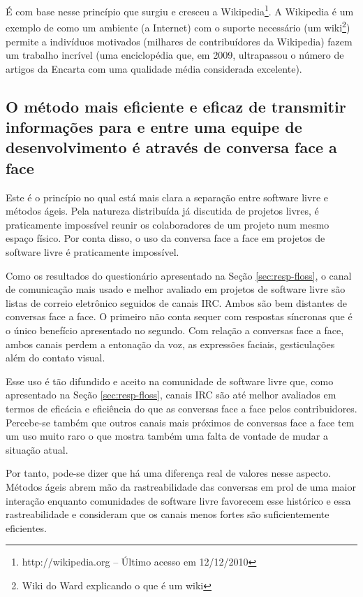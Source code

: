 É com base nesse princípio que surgiu e cresceu a
Wikipedia\footnote{http://wikipedia.org -- Último acesso em
  12/12/2010}. A Wikipedia é um exemplo de como um ambiente (a
Internet) com o suporte necessário (um wiki\footnote{Wiki do Ward
  explicando o que é um wiki}) permite a indivíduos motivados
(milhares de contribuídores da Wikipedia) fazem um trabalho incrível
(uma enciclopédia que, em 2009, ultrapassou o número de artigos da
Encarta com uma qualidade média considerada excelente).

\subsection[Conversa face a face]{O método mais eficiente e eficaz de
  transmitir informações para e entre uma equipe de desenvolvimento é
  através de conversa face a face}

Este é o princípio no qual está mais clara a separação entre software
livre e métodos ágeis. Pela natureza distribuída já discutida de
projetos livres, é praticamente impossível reunir os colaboradores de
um projeto num mesmo espaço físico. Por conta disso, o uso da conversa
face a face em projetos de software livre é praticamente impossível.

Como os resultados do questionário apresentado na Seção
\ref{sec:resp-floss}, o canal de comunicação mais usado e melhor
avaliado em projetos de software livre são listas de correio
eletrônico seguidos de canais IRC. Ambos são bem distantes de
conversas face a face. O primeiro não conta sequer com respostas
síncronas que é o único benefício apresentado no segundo. Com relação
a conversas face a face, ambos canais perdem a entonação da voz, as
expressões faciais, gesticulações além do contato visual.

Esse uso é tão difundido e aceito na comunidade de software livre que,
como apresentado na Seção \ref{sec:resp-floss}, canais IRC são até
melhor avaliados em termos de eficácia e eficiência do que as
conversas face a face pelos contribuidores. Percebe-se também que
outros canais mais próximos de conversas face a face tem um uso muito
raro o que mostra também uma falta de vontade de mudar a situação
atual.

Por tanto, pode-se dizer que há uma diferença real de valores nesse
aspecto. Métodos ágeis abrem mão da rastreabilidade das conversas em
prol de uma maior interação enquanto comunidades de software livre
favorecem esse histórico e essa rastreabilidade e consideram que os
canais menos fortes são suficientemente eficientes.


